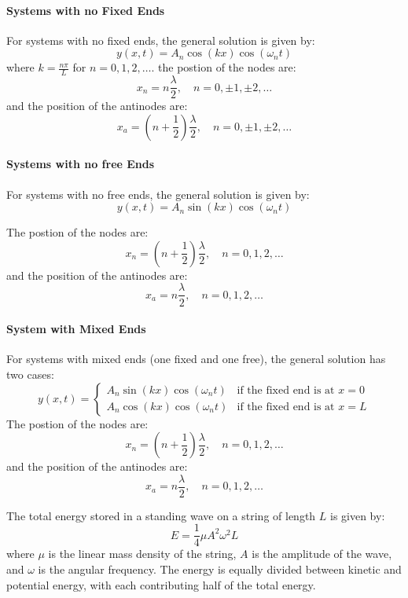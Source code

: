 \documentclass[11pt]{report}
\begin{document}
\paragraph{Systems with no Fixed Ends} For systems with no fixed ends, the general solution is given by:
$$
    y(x,t) = A_n \cos(kx) \cos(\omega_n t)
$$
where \( k = \frac{n\pi}{L} \) for \( n = 0, 1, 2, \ldots \). 
the postion of the nodes are:
$$
    x_n = n \frac{\lambda}{2}, \quad n = 0, \pm 1, \pm 2, \ldots
$$
and the position of the antinodes are:
$$
    x_a = \left(n + \frac{1}{2}\right) \frac{\lambda}{2}, \quad n = 0, \pm 1, \pm 2, \ldots
$$

\paragraph{Systems with no free Ends} For systems with no free ends, the general solution is given by:
$$
    y(x,t) = A_n \sin(kx) \cos(\omega_n t)
$$

The postion of the nodes are:
$$
    x_n = \left(n + \frac{1}{2}\right) \frac{\lambda}{2}, \quad n = 0, 1, 2, \ldots
$$
and the position of the antinodes are:
$$
    x_a = n \frac{\lambda}{2}, \quad n = 0, 1, 2, \ldots
$$

\paragraph{System with Mixed Ends} For systems with mixed ends (one fixed and one free), the general solution has two cases:
$$
    y(x,t) = \begin{cases}
        A_n \sin(kx) \cos(\omega_n t) & \text{if the fixed end is at } x=0 \\
        A_n \cos(kx) \cos(\omega_n t) & \text{if the fixed end is at } x=L
    \end{cases}
$$
The postion of the nodes are:
$$
    x_n = \left(n + \frac{1}{2}\right) \frac{\lambda}{2}, \quad n = 0, 1, 2, \ldots
$$
and the position of the antinodes are:
$$
    x_a = n \frac{\lambda}{2}, \quad n = 0, 1, 2, \ldots
$$

\begin{definition}
    The total energy stored in a standing wave on a string of length \( L \) is given by:
    $$
        E = \frac{1}{4} \mu A^2 \omega^2 L
    $$
    where \( \mu \) is the linear mass density of the string, \( A \) is the amplitude of the wave, and \( \omega \) is the angular frequency. The energy is equally divided between kinetic and potential energy, with each contributing half of the total energy.
\end{definition}
\end{document}
